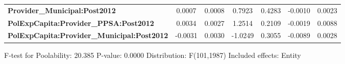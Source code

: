 \begin{center}
\begin{tabular}{lcccccc}
\textbf{Provider\_Municipal:Post2012}              &       0.0007       &       0.0008       &      0.7923     &      0.4283      &      -0.0010      &       0.0023       \\
\textbf{PolExpCapita:Provider\_PPSA:Post2012}      &       0.0034       &       0.0027       &      1.2514     &      0.2109      &      -0.0019      &       0.0088       \\
\textbf{PolExpCapita:Provider\_Municipal:Post2012} &      -0.0031       &       0.0030       &     -1.0249     &      0.3055      &      -0.0089      &       0.0028       \\
\bottomrule
\end{tabular}
\end{center}

F-test for Poolability: 20.385 \newline
 P-value: 0.0000 \newline
 Distribution: F(101,1987) \newline
  \newline
 Included effects: Entity
